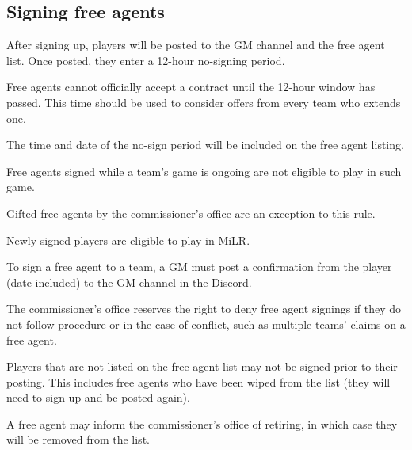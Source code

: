 \subsection{Signing free agents}
\begin{deepEnumerate}
      \item After signing up, players will be posted to the GM channel and the free agent list.
            Once posted, they enter a 12-hour no-signing period.
            \begin{deepEnumerate}
                  \item Free agents cannot officially accept a contract until the 12-hour window has passed.
                        This time should be used to consider offers from every team who extends one.
                  \item The time and date of the no-sign period will be included on the free agent listing.
            \end{deepEnumerate}
      \item Free agents signed while a team's game is ongoing are not eligible to play in such game.
            \begin{deepEnumerate}
                  \item Gifted free agents by the commissioner’s office are an exception to this rule.
                  \item Newly signed players are eligible to play in MiLR.
            \end{deepEnumerate}
      \item To sign a free agent to a team, a GM must post a confirmation from the player
            (date included) to the GM channel in the Discord.
      \item The commissioner’s office reserves the right to deny free agent signings
            if they do not follow procedure or in the case of conflict,
            such as multiple teams' claims on a free agent.
      \item Players that are not listed on the free agent list may not be signed prior to their posting.
            This includes free agents who have been wiped from the list
            (they will need to sign up and be posted again).
      \item A free agent may inform the commissioner’s office of retiring,
            in which case they will be removed from the list.
\end{deepEnumerate}

